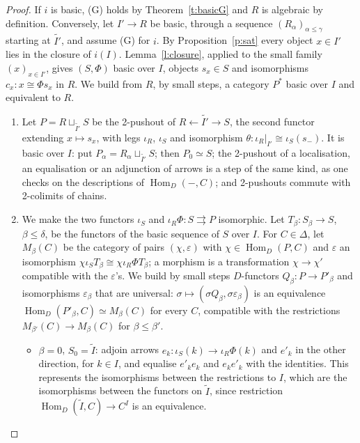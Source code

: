 \documentclass[11pt,a4paper]{amsart}
\theoremstyle{definition}
\theoremstyle{remark}
\newcommand{\Hom}{\operatorname{Hom}}
\begin{document}
\begin{proof}
If $i$ is basic, (G) holds by Theorem~\ref{t:basicG} and $R$ is algebraic by definition. Conversely, let $I'\to R$ be basic, through a sequence $(R_\alpha)_{\alpha\le\gamma}$ starting at $\widetilde{I'}$, and assume (G) for $i$. By Proposition~\ref{p:sat} every object $x\in I'$ lies in the closure of $i(I)$. Lemma~\ref{l:closure}, applied to the small family $(x)_{x\in I'}$, gives $(S,\Phi)$ basic over $I$, objects $s_x\in S$ and isomorphisms $c_x\colon x\cong\Phi s_x$ in $R$. We build from $R$, by small steps, a category $P^*$ basic over $I$ and equivalent to $R$.
\begin{enumerate}
\item Let $P=R\sqcup_{\widetilde{I'}}S$ be the 2-pushout of $R\leftarrow\widetilde{I'}\to S$, the second functor extending $x\mapsto s_x$, with legs $\iota_R$, $\iota_S$ and isomorphism $\theta\colon\iota_R|_{I'}\cong\iota_S(s_{-})$. It is basic over $I$: put $P_\alpha=R_\alpha\sqcup_{\widetilde{I'}}S$; then $P_0\simeq S$; the 2-pushout of a localisation, an equalisation or an adjunction of arrows is a step of the same kind, as one checks on the descriptions of $\Hom_D(-,C)$; and 2-pushouts commute with 2-colimits of chains.
\item We make the two functors $\iota_S$ and $\iota_R\Phi\colon S\rightrightarrows P$ isomorphic. Let $T_\beta\colon S_\beta\to S$, $\beta\le\delta$, be the functors of the basic sequence of $S$ over $I$. For $C\in\Delta$, let $M_\beta(C)$ be the category of pairs $(\chi,\varepsilon)$ with $\chi\in\Hom_D(P,C)$ and $\varepsilon$ an isomorphism $\chi\iota_ST_\beta\cong\chi\iota_R\Phi T_\beta$; a morphism is a transformation $\chi\to\chi'$ compatible with the $\varepsilon$'s. We build by small steps $D$-functors $Q_\beta\colon P\to P'_\beta$ and isomorphisms $\varepsilon_\beta$ that are universal: $\sigma\mapsto(\sigma Q_\beta,\sigma\varepsilon_\beta)$ is an equivalence $\Hom_D(P'_\beta,C)\simeq M_\beta(C)$ for every $C$, compatible with the restrictions $M_{\beta'}(C)\to M_\beta(C)$ for $\beta\le\beta'$.
\begin{itemize}
\item $\beta=0$, $S_0=\widetilde I$: adjoin arrows $e_k\colon\iota_S(k)\to\iota_R\Phi(k)$ and $e'_k$ in the other direction, for $k\in I$, and equalise $e'_ke_k$ and $e_ke'_k$ with the identities. This represents the isomorphisms between the restrictions to $I$, which are the isomorphisms between the functors on $\widetilde I$, since restriction $\Hom_D(\widetilde I,C)\to C^I$ is an equivalence.

\end{itemize}
\end{enumerate}
\end{proof}
\end{document}
